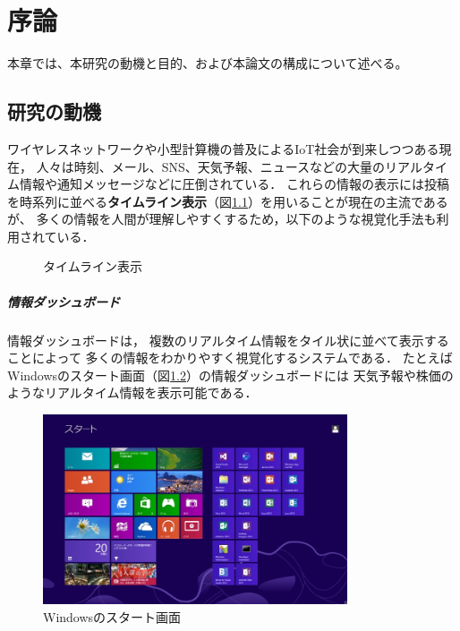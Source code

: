 \chapter{序論}
\label{chap:introduction}

本章では、本研究の動機と目的、および本論文の構成について述べる。

\newpage

\section{研究の動機}

ワイヤレスネットワークや小型計算機の普及によるIoT社会が到来しつつある現在，
人々は時刻、メール、SNS、天気予報、ニュースなどの大量のリアルタイム情報や通知メッセージなどに圧倒されている．
これらの情報の表示には投稿を時系列に並べる{\bf タイムライン表示}（図\ref{timeline}）を用いることが現在の主流であるが、
多くの情報を人間が理解しやすくするため，以下のような視覚化手法も利用されている．

\begin{figure}[h]
\centering
{}
\caption{タイムライン表示}
\label{timeline}
\end{figure}

\vspace{3mm}

\paragraph*{情報ダッシュボード}

情報ダッシュボード\cite{few}は，
複数のリアルタイム情報をタイル状に並べて表示することによって
多くの情報をわかりやすく視覚化するシステムである．
たとえばWindowsのスタート画面（図\ref{windows}）の情報ダッシュボードには
天気予報や株価のようなリアルタイム情報を表示可能である．

\begin{figure}[h]
\centering
\includegraphics[width=9cm]{images/windows.png}
\caption{Windowsのスタート画面}
\label{windows}
\end{figure}

